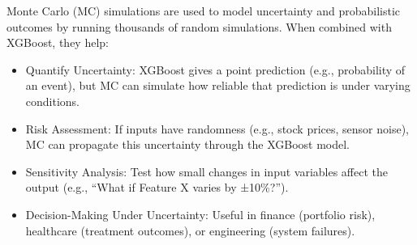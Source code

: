 \documentclass[
  letterpaper,
  DIV=11,
  numbers=noendperiod]{scrartcl}
\begin{document}
Monte Carlo (MC) simulations are used to model uncertainty and
probabilistic outcomes by running thousands of random simulations. When
combined with XGBoost, they help:

\begin{itemize}
\item
  Quantify Uncertainty: XGBoost gives a point prediction (e.g.,
  probability of an event), but MC can simulate how reliable that
  prediction is under varying conditions.
\item
  Risk Assessment: If inputs have randomness (e.g., stock prices, sensor
  noise), MC can propagate this uncertainty through the XGBoost model.
\item
  Sensitivity Analysis: Test how small changes in input variables affect
  the output (e.g., ``What if Feature X varies by ±10\%?'').
\item
  Decision-Making Under Uncertainty: Useful in finance (portfolio risk),
  healthcare (treatment outcomes), or engineering (system failures).
\end{itemize}
\end{document}

